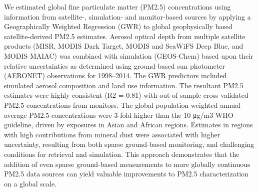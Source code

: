 We estimated global fine particulate matter (PM2.5) concentrations using information from satellite-, simulation- and monitor-based sources by applying a Geographically Weighted Regression (GWR) to global geophysically based satellite-derived PM2.5 estimates. Aerosol optical depth from multiple satellite products (MISR, MODIS Dark Target, MODIS and SeaWiFS Deep Blue, and MODIS MAIAC) was combined with simulation (GEOS-Chem) based upon their relative uncertainties as determined using ground-based sun photometer (AERONET) observations for 1998–2014. The GWR predictors included simulated aerosol composition and land use information. The resultant PM2.5 estimates were highly consistent (R2 = 0.81) with out-of-sample cross-validated PM2.5 concentrations from monitors. The global population-weighted annual average PM2.5 concentrations were 3-fold higher than the 10 μg/m3 WHO guideline, driven by exposures in Asian and African regions. Estimates in regions with high contributions from mineral dust were associated with higher uncertainty, resulting from both sparse ground-based monitoring, and challenging conditions for retrieval and simulation. This approach demonstrates that the addition of even sparse ground-based measurements to more globally continuous PM2.5 data sources can yield valuable improvements to PM2.5 characterization on a global scale.